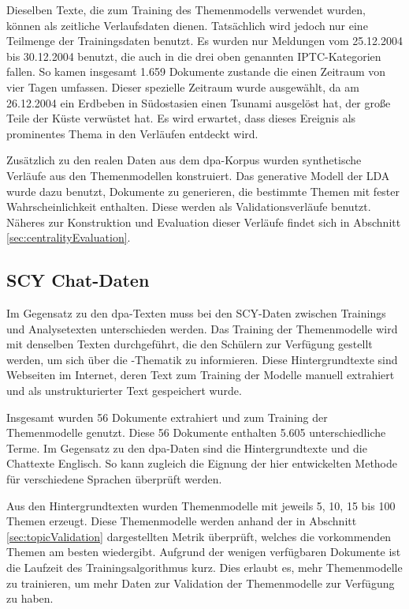 Dieselben Texte, die zum Training des Themenmodells verwendet wurden, können als zeitliche Verlaufsdaten dienen. Tatsächlich wird jedoch nur eine Teilmenge der Trainingsdaten benutzt. Es wurden nur Meldungen vom 25.12.2004 bis 30.12.2004 benutzt, die auch in die drei oben genannten IPTC-Kategorien fallen. So kamen insgesamt 1.659 Dokumente zustande die einen Zeitraum von vier Tagen umfassen. Dieser spezielle Zeitraum wurde ausgewählt, da am 26.12.2004 ein Erdbeben in Südostasien einen Tsunami ausgelöst hat, der große Teile der Küste verwüstet hat. Es wird erwartet, dass dieses Ereignis als prominentes Thema in den Verläufen entdeckt wird. 

Zusätzlich zu den realen Daten aus dem dpa-Korpus wurden synthetische Verläufe aus den Themenmodellen konstruiert. Das generative Modell der LDA wurde dazu benutzt, Dokumente zu generieren, die bestimmte Themen mit fester Wahrscheinlichkeit enthalten. Diese werden als Validationsverläufe benutzt. Näheres zur Konstruktion und Evaluation dieser Verläufe findet sich in Abschnitt \ref{sec:centralityEvaluation}.

\subsection{SCY Chat-Daten}
Im Gegensatz zu den dpa-Texten muss bei den SCY-Daten zwischen Trainings und Analysetexten unterschieden werden. Das Training der Themenmodelle wird mit denselben Texten durchgeführt, die den Schülern zur Verfügung gestellt werden, um sich über die \COTWO-Thematik zu informieren. Diese Hintergrundtexte sind Webseiten im Internet, deren Text zum Training der Modelle manuell extrahiert und als unstrukturierter Text gespeichert wurde. 

Insgesamt wurden 56 Dokumente extrahiert und zum Training der Themenmodelle genutzt. Diese 56 Dokumente enthalten 5.605 unterschiedliche Terme. Im Gegensatz zu den dpa-Daten sind die Hintergrundtexte und die Chattexte Englisch. So kann zugleich die Eignung der hier entwickelten Methode für verschiedene Sprachen überprüft werden. 

Aus den Hintergrundtexten wurden Themenmodelle mit jeweils 5, 10, 15 bis 100 Themen erzeugt. Diese Themenmodelle werden anhand der in Abschnitt \ref{sec:topicValidation} dargestellten Metrik überprüft, welches die vorkommenden Themen am besten wiedergibt. Aufgrund der wenigen verfügbaren Dokumente ist die Laufzeit des Trainingsalgorithmus kurz. Dies erlaubt es, mehr Themenmodelle zu trainieren, um mehr Daten zur Validation der Themenmodelle zur Verfügung zu haben.

